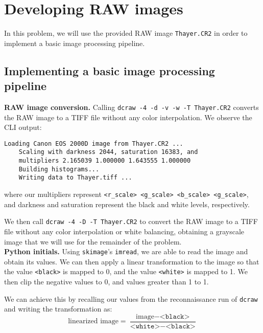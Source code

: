 \section{Developing RAW images}
In this problem, we will use the provided RAW image \texttt{Thayer.CR2} 
in order to implement a basic image processing pipeline.

\subsection{Implementing a basic image processing pipeline}


\textbf{RAW image conversion.}
Calling \texttt{dcraw -4 -d -v -w -T Thayer.CR2} 
converts the RAW image to a TIFF file without any color interpolation. 
We observe the CLI output:
\begin{Verbatim}[fontsize=\small]
    Loading Canon EOS 2000D image from Thayer.CR2 ...
    Scaling with darkness 2044, saturation 16383, and
    multipliers 2.165039 1.000000 1.643555 1.000000
    Building histograms...
    Writing data to Thayer.tiff ...
\end{Verbatim}
where our multipliers represent \texttt{<r\_scale> <g\_scale> <b\_scale> <g\_scale>},
and darkness and saturation represent the black and white levels, respectively.

We then call \texttt{dcraw -4 -D -T Thayer.CR2} to convert the RAW image to a TIFF file 
without any color interpolation or white balancing, obtaining a grayscale image that  
we will use for the remainder of the problem.\\


\noindent\textbf{Python initials.}
Using \texttt{skimage}'s \texttt{imread}, we are able to read the image and obtain its values. 
We can then apply a linear transformation to the image so that the value \texttt{<black>} is 
mapped to 0, and the value \texttt{<white>} is mapped to 1. We then clip the negative 
values to 0, and values greater than 1 to 1.

We can achieve this by recalling our values from the reconnaissance run of \texttt{dcraw} and
writing the transformation as:
\begin{equation}
    \text{linearized image} = \frac{\text{image} - \texttt{<black>}}{\texttt{<white>} - \texttt{<black>}}
\end{equation}
